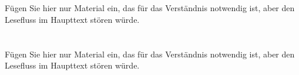   \appendix
  \chapter{}
  \label{app:material-one}
  Fügen Sie hier nur Material ein, das für das Verständnis notwendig ist,
  aber den Lesefluss im Haupttext stören würde.

  \chapter{}
  \label{app:material-two}
  Fügen Sie hier nur Material ein, das für das Verständnis notwendig ist,
  aber den Lesefluss im Haupttext stören würde.
\fi

\label{LastNumberedPage}
\clearpage
